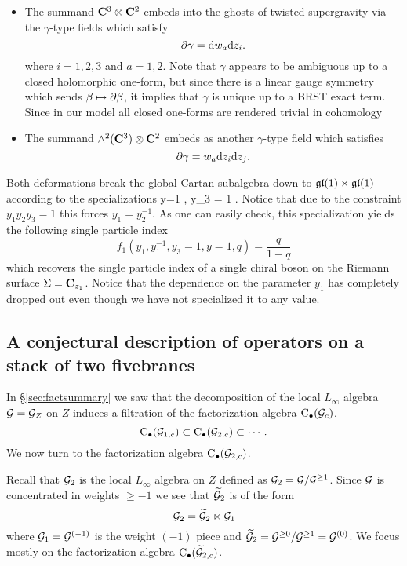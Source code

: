 \begin{itemize}
\item The summand $\mathbf{C}^3 \otimes \mathbf{C}^2$ embeds into the ghosts of twisted supergravity via the $\gamma$-type fields which satisfy
\[
\partial \gamma = {\rm d} w_a {\rm d} z_i .
\]
where $i=1,2,3$ and $a = 1,2$.
Note that $\gamma$ appears to be ambiguous up to a closed holomorphic one-form, but since there is a linear gauge symmetry which sends $\beta \mapsto \partial \beta$, it implies that $\gamma$ is unique up to a BRST exact term. 
Since in our model all closed one-forms are rendered trivial in cohomology
\item The summand $\wedge^2(\mathbf{C}^3) \otimes \mathbf{C}^2$ embeds as another $\gamma$-type field which satisfies 
\[
\partial \gamma = w_a {\rm d} z_i {\rm d} z_j .
\]
\end{itemize}

Both deformations break the global Cartan subalgebra down to $\mathfrak{gl}(1) \times \mathfrak{gl}(1)$ according to the specializations
\beqn\label{eqn:special1}
y=1 , \quad y_3 = 1 .
\eeqn
Notice that due to the constraint $y_1y_2y_3=1$ this forces $y_1 = y_2^{-1}$.
As one can easily check, this specialization yields the following single particle index
\[
f_{1}(y_1, y_1^{-1},y_3=1, y=1, q) = \frac{q}{1-q} 
\]
which recovers the single particle index of a single chiral boson on the Riemann surface $\Sigma = \mathbf{C}_{z_1}$. 
Notice that the dependence on the parameter $y_1$ has completely dropped out even though we have not specialized it to any value.

\subsection{A conjectural description of operators on a stack of two fivebranes}

In \S\ref{sec:factsummary} we saw that the decomposition of the local $L_\infty$ algebra $\mathcal G = \mathcal G_Z$ on $Z$ induces a filtration of the factorization algebra ${\rm C}_\bullet(\mathcal G_c)$. 
\[
{\rm C}_{\bullet}(\mathcal G_{1,c}) \subset {\rm C}_{\bullet}(\mathcal G_{2,c}) \subset \cdots .
\]
We now turn to the factorization algebra ${\rm C}_{\bullet}(\mathcal G_{2,c})$.

Recall that $\mathcal G_{2}$ is the local $L_\infty$ algebra on $Z$ defined as $\mathcal G_{2} = \mathcal G / \mathcal G^{\geq 1}$. 
Since $\mathcal G$ is concentrated in weights $\geq -1$ we see that $\widetilde {\mathcal G}_{2}$ is of the form
\[
\mathcal G_2 = \widetilde {\mathcal G}_2 \ltimes \mathcal G_1 
\]
where $\mathcal G_1 = \mathcal G^{(-1)}$ is the weight $(-1)$ piece and $\widetilde {\mathcal G}_2 = \mathcal G^{\geq 0} / \mathcal G^{\geq 1} = \mathcal G^{(0)}$.  
We focus mostly on the factorization algebra ${\rm C}_\bullet(\widetilde {\mathcal G}_{2,c})$.

